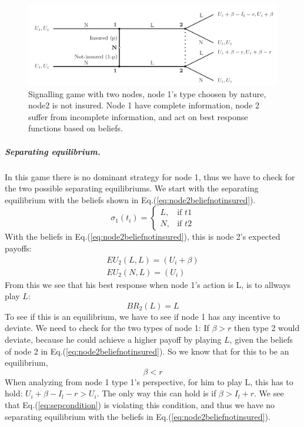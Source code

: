 \begin{figure}[h]
\centering

  \centering
\includegraphics[width=1\linewidth]{../Figures/SignalingGameNotInsured.png}

\caption{Signalling game with two nodes, node 1's type choosen by nature, node2 is not insured. Node 1 have complete information, node 2 suffer from incomplete information, and act on best response functions based on beliefs. \label{fig:signalingNotInsured}}

\end{figure}
\subparagraph{Separating equilibrium.}
In this game there is no dominant strategy for node 1, thus we have to check for the two possible separating equilibriums.
We start with the separating equilibrium with the beliefs shown in Eq.(\ref{eq:node2beliefnotinsured}).
\begin{equation}
    \sigma_{1}(t_{i})= 
\begin{cases}
   L,& \text{if } t1\\
   N,& \text{if } t2  
\end{cases}
\label{eq:node2beliefnotinsured}
\end{equation}
With the beliefs in Eq.(\ref{eq:node2beliefnotinsured}), this is node 2's expected payoffs:
\begin{eqnarray}
EU_{2}(L,L)=(U_{i}+\beta) \\
EU_{2}(N,L)=(U_{i})
\end{eqnarray}
From this we see that his best response when node 1's action is L, is to allways play $L$: \begin{equation}
BR_{2}(L)= L
\end{equation}
To see if this is an equilibrium, we have to see if node 1 has any incentive to deviate. 
We need to check for the two types of node 1:
If $\beta>r$ then type 2 would deviate, because he could achieve a higher payoff by playing $L$, given the beliefs of node 2 in Eq.(\ref{eq:node2beliefnotinsured}). So we know that for this to be an equilibrium, \begin{equation}
\beta < r
\label{eq:sepcondition}
\end{equation}  
When analyzing from node 1 type 1's perspective, for him to play L, this has to hold: $U_{i}+\beta-I_{l}-r > U_{i}$. The only way this can hold is if $\beta>I_{l}+r$. We see that Eq.(\ref{eq:sepcondition}) is violating this condition, and thus we have no separating equilibrium with the beliefs in Eq.(\ref{eq:node2beliefnotinsured}).

